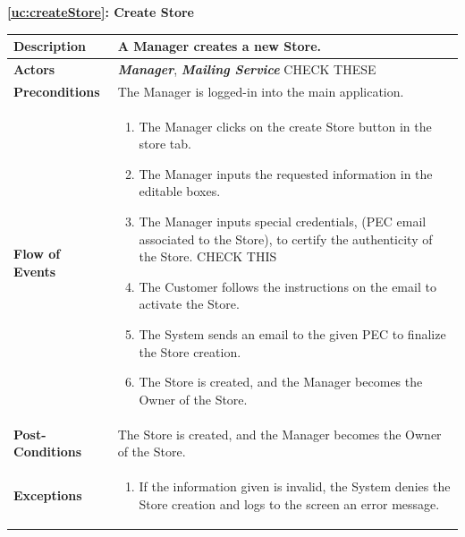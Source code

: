 \documentclass[a4paper, 10pt, oneside]{article}
\newcommand*{\lorenzo}[1]{\textcolor{BurntOrange}{#1}}
\begin{document}
\begin{center}
{\textbf{\ref{uc:createStore}: Create Store}}
\end{center}
\begin{tabularx}{\linewidth}{| l | X |}
	
	\hline
	\textbf{Description} & A Manager creates a new Store.\\
	

	\hline
	\textbf{Actors} & \textbf{\textit{Manager}}, \textit{\textbf{Mailing Service}}  \lorenzo{CHECK THESE}\\
	
	\hline
	\textbf{Preconditions} & The Manager is logged-in into the main application. \\
	
	\hline
	\textbf{Flow of Events} & \parbox{0.7\textwidth}{	
		\begin{enumerate}
			\item The Manager clicks on the create Store button in the store tab.
			\item The Manager inputs the requested information in the editable boxes.
			\item The Manager inputs special credentials, (PEC email associated to the Store), to certify the authenticity of the Store. \lorenzo{CHECK THIS}
			\item The Customer follows the instructions on the email to activate the Store.
			\item The System sends an email to the given PEC to finalize the Store creation.
			\item The Store is created, and the Manager becomes the Owner of the Store.
	\end{enumerate}}\\
	
	\hline
	\textbf{Post-Conditions} & The Store is created, and the Manager becomes the Owner of the Store.\\
	
	\hline
	\textbf{Exceptions} & \parbox{0.7\textwidth}{ \begin{enumerate}
			\item If the information given is invalid, the System denies the Store creation and logs to the screen an error message.
		\end{enumerate}}\\

	\hline
\end{tabularx}
\end{document}
